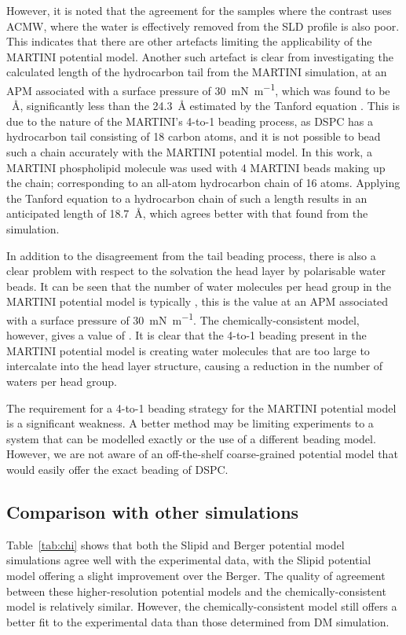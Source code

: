 However, it is noted that the agreement for the samples where the contrast uses ACMW, where the water is effectively removed from the SLD profile is also poor.
This indicates that there are other artefacts limiting the applicability of the MARTINI potential model.
Another such artefact is clear from investigating the calculated length of the hydrocarbon tail from the MARTINI simulation, at an APM associated with a surface pressure of \SI{30}{\milli\newton\per\meter}, which was found to be ~\si{\angstrom}, significantly less than the \SI{24.3}{\angstrom} estimated by the Tanford equation \cite{tanford_hydrophobic_1980}.
This is due to the nature of the MARTINI's 4-to-1 beading process, as DSPC has a hydrocarbon tail consisting of 18 carbon atoms, and it is not possible to bead such a chain accurately with the MARTINI potential model.
In this work, a MARTINI phospholipid molecule was used with 4 MARTINI beads making up the chain; corresponding to an all-atom hydrocarbon chain of 16 atoms.
Applying the Tanford equation to a hydrocarbon chain of such a length results in an anticipated length of \SI{18.7}{\angstrom}, which agrees better with that found from the simulation.

In addition to the disagreement from the tail beading process, there is also a clear problem with respect to the solvation the head layer by polarisable water beads.
It can be seen that the number of water molecules per head group in the MARTINI potential model is typically , this is the value at an APM associated with a surface pressure of \SI{30}{\milli\newton\per\meter}.
The chemically-consistent model, however, gives a value of .
It is clear that the 4-to-1 beading present in the MARTINI potential model is creating water molecules that are too large to intercalate into the head layer structure, causing a reduction in the number of waters per head group.

The requirement for a 4-to-1 beading strategy for the MARTINI potential model is a significant weakness.
A better method may be limiting experiments to a system that can be modelled exactly or the use of a different beading model.
However, we are not aware of an off-the-shelf coarse-grained potential model that would easily offer the exact beading of DSPC.

\subsection{Comparison with other simulations}
Table~\ref{tab:chi} shows that both the Slipid and Berger potential model simulations agree well with the experimental data, with the Slipid potential model offering a slight improvement over the Berger.
The quality of agreement between these higher-resolution potential models and the chemically-consistent model is relatively similar.
However, the chemically-consistent model still offers a better fit to the experimental data than those determined from DM simulation.

